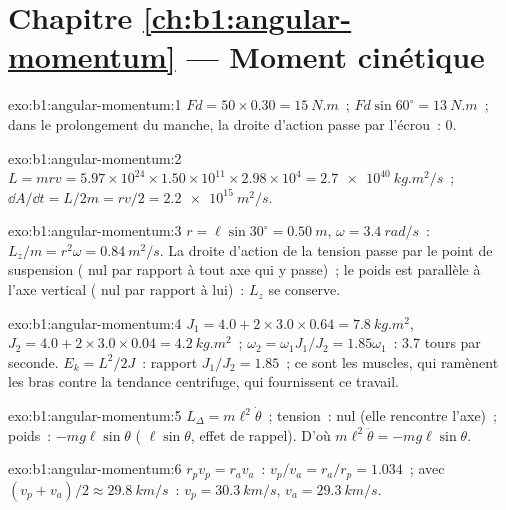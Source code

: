 \section*{Chapitre \ref{ch:b1:angular-momentum} --- Moment cinétique}

\begin{solution}{exo:b1:angular-momentum:1}
$Fd = 50 \times 0.30 = \qty{15}{N.m}$~; $Fd\sin 60^\circ = \qty{13}{N.m}$~;
dans le prolongement du manche, la droite d'action passe par l'écrou~: $0$.
\end{solution}

\begin{solution}{exo:b1:angular-momentum:2}
$L = mrv = 5.97\times10^{24} \times 1.50\times10^{11} \times 2.98\times10^4 =
\qty{2.7e40}{kg.m^2/s}$~; $\dd A/\dd t = L/2m = rv/2 = \qty{2.2e15}{m^2/s}$.
\end{solution}

\begin{solution}{exo:b1:angular-momentum:3}
$r = \ell\sin 30^\circ = \qty{0.50}{m}$, $\omega = \qty{3.4}{rad/s}$~:
$L_z/m = r^2\omega = \qty{0.84}{m^2/s}$. La droite d'action de la tension
passe par le point de suspension ( nul par rapport à tout axe qui
y passe)~; le poids est parallèle à l'axe vertical ( nul par
rapport à lui)~: $L_z$ se conserve.
\end{solution}

\begin{solution}{exo:b1:angular-momentum:4}
$J_1 = 4.0 + 2 \times 3.0 \times 0.64 = \qty{7.8}{kg.m^2}$, $J_2 = 4.0 +
2 \times 3.0 \times 0.04 = \qty{4.2}{kg.m^2}$~; $\omega_2 = \omega_1J_1/J_2 =
1.85\omega_1$~: \qty{3.7}{} tours par seconde. $E_k = L^2/2J$~: rapport
$J_1/J_2 = 1.85$~; ce sont les muscles, qui ramènent les bras contre la
tendance centrifuge, qui fournissent ce travail.
\end{solution}

\begin{solution}{exo:b1:angular-momentum:5}
$L_\Delta = m\ell^2\dot\theta$~; tension~:  nul (elle rencontre
l'axe)~; poids~: $-mg\ell\sin\theta$ ( $\ell\sin\theta$,
effet de rappel). D'où $m\ell^2\ddot\theta = -mg\ell\sin\theta$.
\end{solution}

\begin{solution}{exo:b1:angular-momentum:6}
$r_pv_p = r_av_a$~: $v_p/v_a = r_a/r_p = 1.034$~; avec $(v_p + v_a)/2 \approx
\qty{29.8}{km/s}$~: $v_p = \qty{30.3}{km/s}$, $v_a = \qty{29.3}{km/s}$.
\end{solution}


